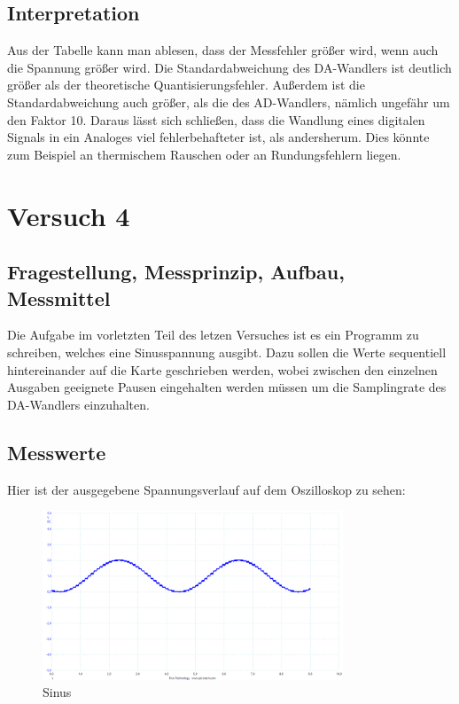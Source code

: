 \documentclass[12pt, oneside, a4paper, \docLanguage]{report}
\begin{document}
\pagebreak

\section{Interpretation}
\label{chap:VERSUCH_3_INTERPRETATION}
\begin{normalsize}
Aus der Tabelle kann man ablesen, dass der Messfehler größer wird, wenn auch die Spannung größer wird. Die Standardabweichung des DA-Wandlers ist deutlich größer als der theoretische Quantisierungsfehler. Außerdem ist die Standardabweichung auch größer, als die des AD-Wandlers, nämlich ungefähr um den Faktor 10.
Daraus lässt sich schließen, dass die Wandlung eines digitalen Signals in ein Analoges viel fehlerbehafteter ist, als andersherum. Dies könnte zum Beispiel an thermischem Rauschen oder an Rundungsfehlern liegen. 
\end{normalsize}

%
%
\chapter{Versuch 4}
\label{chap:VERSUCH_4}

\section{Fragestellung, Messprinzip, Aufbau, Messmittel}
\label{chap:VERSUCH_4_FRAGESTELLUNG}
\begin{normalsize}
Die Aufgabe im vorletzten Teil des letzen Versuches ist es ein Programm zu schreiben, welches eine Sinusspannung ausgibt.
Dazu sollen die Werte sequentiell hintereinander auf die Karte geschrieben werden,
wobei zwischen den einzelnen Ausgaben geeignete Pausen eingehalten werden müssen um die Samplingrate des DA-Wandlers einzuhalten.	
\end{normalsize}

\section{Messwerte}
\label{chap:VERSUCH_4_MESSWERTE}
Hier ist der ausgegebene Spannungsverlauf auf dem Oszilloskop zu sehen:
\begin{figure}[H]
	\centering
	\includegraphics[width=0.8\textwidth]{../Images/Sinus.png}
	\caption{Sinus}
\end{figure}
\end{document}
